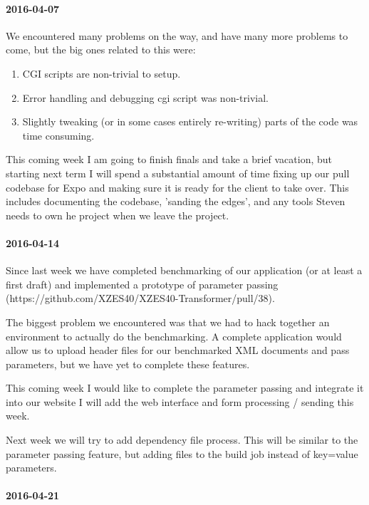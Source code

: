 \paragraph{2016-04-07}

We encountered many problems on the way, and have many more problems to come, but the big ones related to this were:

\begin{enumerate}
  \item CGI scripts are non-trivial to setup.
  \item Error handling and debugging cgi script was non-trivial.
  \item Slightly tweaking (or in some cases entirely re-writing) parts of the code was time consuming.
\end{enumerate}

This coming week I am going to finish finals and take a brief vacation, but starting next term I will spend a substantial amount of time fixing up our pull codebase for Expo and making sure it is ready for the client to take over.
This includes documenting the codebase, 'sanding the edges', and any tools Steven needs to own he project when we leave the project.

\paragraph{2016-04-14}

Since last week we have completed benchmarking of our application (or at least a first draft) and implemented a prototype of parameter passing (https://github.com/XZES40/XZES40-Transformer/pull/38).

The biggest problem we encountered was that we had to hack together an environment to actually do the benchmarking.
A complete application would allow us to upload header files for our benchmarked XML documents and pass parameters, but we have yet to complete these features.

This coming week I would like to complete the parameter passing and integrate it into our website  I will add the web interface and form processing / sending this week.

Next week we will try to add dependency file process.
This will be similar to the parameter passing feature, but adding files to the build job instead of key=value parameters.

\paragraph{2016-04-21}

